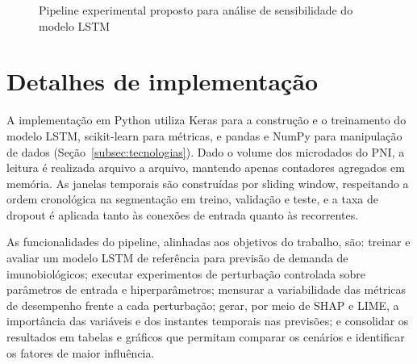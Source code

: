 \documentclass[
    12pt,
    openright,
    oneside,
    a4paper,
    english,
    brazil
]{abntex2}
\begin{document}
\begin{figure}[H]
    \caption{Pipeline experimental proposto para análise de sensibilidade do modelo LSTM}
    \label{fig:pipeline}
\end{figure}

\section{Detalhes de implementação}
\label{subsec:funcionalidades}

A implementação em Python utiliza Keras para a construção e o treinamento do modelo LSTM, scikit-learn para métricas, e pandas e NumPy para manipulação de dados (Seção~\ref{subsec:tecnologias}). Dado o volume dos microdados do PNI, a leitura é realizada arquivo a arquivo, mantendo apenas contadores agregados em memória. As janelas temporais são construídas por sliding window, respeitando a ordem cronológica na segmentação em treino, validação e teste, e a taxa de dropout é aplicada tanto às conexões de entrada quanto às recorrentes.

As funcionalidades do pipeline, alinhadas aos objetivos do trabalho, são: treinar e avaliar um modelo LSTM de referência para previsão de demanda de imunobiológicos; executar experimentos de perturbação controlada sobre parâmetros de entrada e hiperparâmetros; mensurar a variabilidade das métricas de desempenho frente a cada perturbação; gerar, por meio de SHAP e LIME, a importância das variáveis e dos instantes temporais nas previsões; e consolidar os resultados em tabelas e gráficos que permitam comparar os cenários e identificar os fatores de maior influência.
\end{document}
